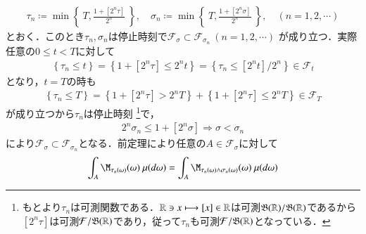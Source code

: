 	\begin{prf}
		\begin{align}
			\tau_n \coloneqq \min{}{\left\{\ T, \frac{1+[2^n \tau]}{2^n}\ \right\}},
			\quad \sigma_n \coloneqq \min{}{\left\{\ T, \frac{1+[2^n \sigma]}{2^n}\ \right\}},
			\quad (n=1,2,\cdots)
		\end{align}
		とおく．このとき$\tau_n,\sigma_n$は停止時刻で$\mathcal{F}_\sigma \subset \mathcal{F}_{\sigma_n}\ (n=1,2,\cdots)$
		が成り立つ．実際任意の$0 \leq t < T$に対して
		\begin{align}
			\left\{ \tau_n \leq t \right\} = \left\{ 1 + [2^n \tau] \leq 2^n t \right\} = \left\{ \tau_n \leq [2^n t]/2^n \right\} \in \mathcal{F}_t
		\end{align}
		となり，$t = T$の時も
		\begin{align}
			\left\{ \tau_n \leq T \right\} = \left\{ 1 + [2^n \tau] > 2^n T \right\} + \left\{ 1 + [2^n \tau] \leq 2^n T \right\} \in \mathcal{F}_T
		\end{align}
		が成り立つから$\tau_n$は停止時刻
		\footnote{
			もとより$\tau_n$は可測関数である．$\mathbb{R} \ni x \longmapsto [x] \in \mathbb{R}$は可測$\mathfrak{B}(\mathbb{R})/\mathfrak{B}(\mathbb{R})$であるから
			$[2^n \tau]$は可測$\mathcal{F}/\mathfrak{B}(\mathbb{R})$であり，従って$\tau_n$も可測$\mathcal{F}/\mathfrak{B}(\mathbb{R})$となっている．
		}で，
		\begin{align}
			2^n \sigma_n \leq 1 + [2^n \sigma] 
			\Rightarrow \sigma < \sigma_n
		\end{align}
		により$\mathcal{F}_\sigma \subset \mathcal{F}_{\sigma_n}$となる．前定理により任意の$A \in \mathcal{F}_\sigma$に対して
		\begin{align}
			\int_A \M_{\tau_n(\omega)}(\omega)\ \mu(d\omega) = \int_A \M_{\tau_n(\omega)\wedge \sigma_n(\omega)}(\omega)\ \mu(d\omega) 
		\end{align}
	\end{prf}